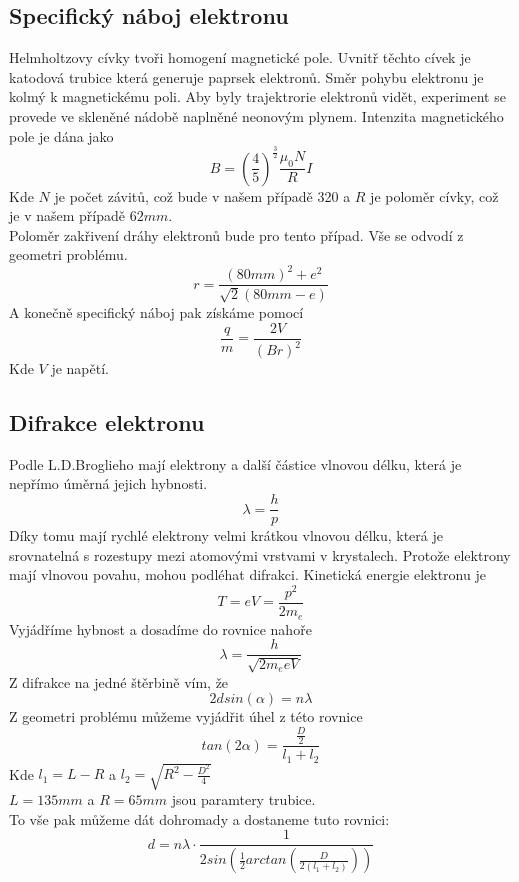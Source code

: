 \documentclass{article}
\begin{document}
\subsection{Specifický náboj elektronu}
Helmholtzovy cívky tvoři homogení magnetické pole.
Uvnitř těchto cívek je katodová trubice která generuje paprsek elektronů.
Směr pohybu elektronu je kolmý k magnetickému poli.
Aby byly trajektrorie elektronů vidět, experiment se provede
ve skleněné nádobě naplněné neonovým plynem.
Intenzita magnetického pole je dána jako
\begin{equation}
  B = \left( \frac{4}{5} \right)^{\frac{3}{2}} \frac{\mu_{0}N}{R} I
\end{equation}
Kde $N$ je počet závitů, což bude v našem případě 320 a $R$ je poloměr cívky, což je v našem případě
$62 mm$.\\
Poloměr zakřivení dráhy elektronů bude pro tento případ. Vše se odvodí z geometri problému.
\begin{equation}
  r = \frac{(80mm)^{2} + e^{2}}{\sqrt{2} (80mm - e)}
\end{equation}
A konečně specifický náboj pak získáme pomocí
\begin{equation}
  \frac{q}{m} = \frac{2V}{(Br)^{2}}
\end{equation}
Kde $V$ je napětí.
\subsection{Difrakce elektronu}
Podle L.D.Broglieho mají elektrony a další částice vlnovou délku, která je nepřímo úměrná jejich
hybnosti.
\begin{equation}
  \lambda = \frac{h}{p}
\end{equation}
Díky tomu mají rychlé elektrony velmi krátkou vlnovou délku, která je srovnatelná s rozestupy mezi atomovými vrstvami v krystalech. Protože elektrony mají vlnovou povahu, mohou podléhat difrakci.
Kinetická energie elektronu je
\begin{equation}
  T = eV = \frac{p^{2}}{2m_{e}}
\end{equation}
Vyjádříme hybnost a dosadíme do rovnice nahoře
\begin{equation}
  \lambda = \frac{h}{\sqrt{2m_{e}eV}}
\end{equation}
Z difrakce na jedné štěrbině vím, že
\begin{equation}
  2dsin(\alpha) = n \lambda
\end{equation}
Z geometri problému můžeme vyjádřit úhel z této rovnice
\begin{equation}
  tan(2 \alpha) = \frac{\frac{D}{2}}{l_{1} + l_{2}}
\end{equation}
Kde $l_{1} = L - R$ a $l_{2} = \sqrt{R^{2} - \frac{D^{2}}{4}}$\\
$L = 135mm$ a $R = 65mm$ jsou paramtery trubice.\\
To vše pak můžeme dát dohromady a dostaneme tuto rovnici:
\begin{equation}\label{final}
  d = n \lambda \cdot \frac{1}{2sin \left(\frac{1}{2} arctan \left( \frac{D}{2(l_{1} + l_{2})} \right)  \right)}
\end{equation}
\end{document}
